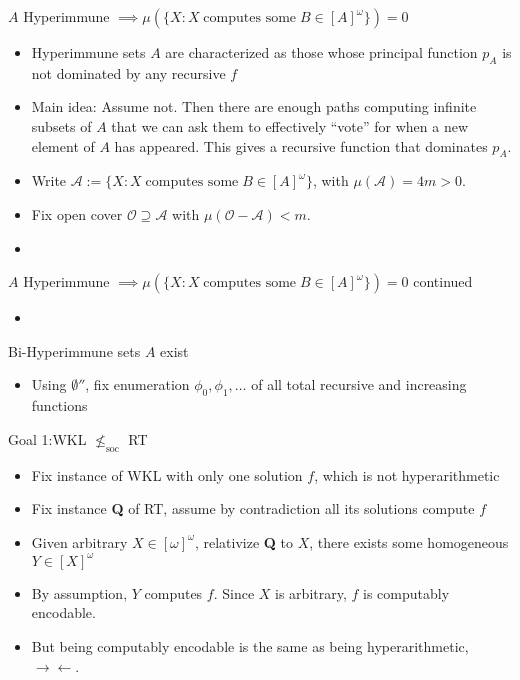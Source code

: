 \documentclass[notes]{beamer}
\begin{document}
\begin{frame}{$A$ Hyperimmune $\implies \mu(\{X: X\; \text{computes some}\;
B\in[A]^\omega\}) =0$}
  \begin{itemize}
    \item Hyperimmune sets $A$ are characterized as those whose principal
      function $p_A$ is not dominated by any recursive $f$
    \item Main idea: Assume not. Then there are enough paths computing
      infinite subsets of $A$ that we can ask them to effectively ``vote''
      for when a new element of $A$ has appeared. This gives a recursive
      function that dominates $p_A$.
    \item Write $\mathcal{A} :=\{X: X\; \text{computes some}\;
      B\in[A]^\omega\}$, with $\mu(\mathcal{A})=4m>0$.
    \item Fix open cover $\mathcal{O}\supseteq\mathcal{A}$ with
      $\mu(\mathcal{O}-\mathcal{A})<m$.
    \item
  \end{itemize}
\end{frame}

\begin{frame}{$A$ Hyperimmune $\implies \mu(\{X: X\; \text{computes some}\;
B\in[A]^\omega\}) =0$ continued}
  \begin{itemize}
    \item
  \end{itemize}
\end{frame}

\begin{frame}{Bi-Hyperimmune sets $A$ exist}
  \begin{itemize}
    \item Using $\emptyset''$, fix enumeration $\phi_0,\phi_1,\ldots$ of
      all total recursive and increasing functions
  \end{itemize}
\end{frame}

\begin{frame}{Goal 1:WKL $\nleq_{\text{soc}}$ RT}
  \begin{itemize}
    \item Fix instance of WKL with only one solution $f$, which is
      not hyperarithmetic
    \item Fix instance \textbf{Q} of RT, assume by contradiction all
      its solutions compute $f$ 
    \item Given arbitrary $X\in[\omega]^\omega$, relativize \textbf{Q} to
      $X$, there exists some homogeneous $Y\in[X]^\omega$
    \item By assumption, $Y$ computes $f$. Since $X$ is arbitrary, $f$ is
      computably encodable.
    \item But being computably encodable is the same as being
      hyperarithmetic, $\rightarrow\leftarrow$.
  \end{itemize}
\end{frame}
\end{document}
